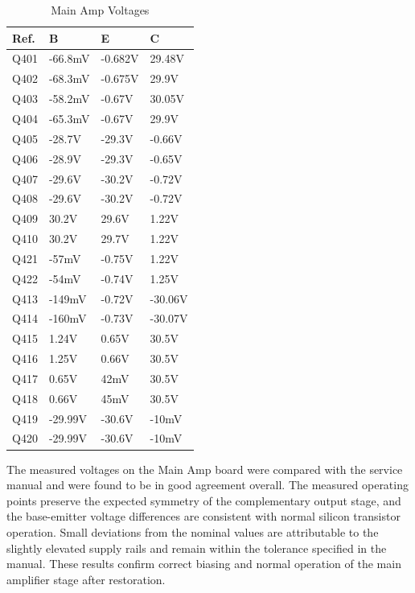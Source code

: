 \documentclass[]{article}
\begin{document}
\begin{table}[H]
	\centering
	\caption{Main Amp Voltages}
	\label{tab:main_amp_voltages}
	\begin{tabular}{|l|l|l|l|}
    \hline
 \textbf{Ref.} & \textbf{B} & \textbf{E} & \textbf{C} \\
    \hline
    Q401 & -66.8mV  & -0.682V  & 29.48V   \\
    \hline
    Q402 & -68.3mV  & -0.675V   & 29.9V  \\
    \hline
    Q403 & -58.2mV  &  -0.67V  & 30.05V  \\
    \hline
    Q404 & -65.3mV  &  -0.67V  & 29.9V \\
    \hline
    Q405 & -28.7V  & -29.3V  & -0.66V  \\
    \hline
    Q406 & -28.9V  & -29.3V   & -0.65V   \\
    \hline
    Q407 & -29.6V  &  -30.2V  &  -0.72V \\
    \hline
    Q408 & -29.6V  & -30.2V  &  -0.72V  \\
    \hline
    Q409 & 30.2V  &  29.6V  &  1.22V \\
    \hline
    Q410 & 30.2V  &  29.7V  &  1.22V \\
    \hline
    Q421 & -57mV  &  -0.75V  & 1.22V  \\
    \hline
    Q422 & -54mV  & -0.74V   & 1.25V  \\
    \hline
    Q413 & -149mV   &   -0.72V & -30.06V \\
    \hline
    Q414 & -160mV  &  -0.73V  & -30.07V  \\
    \hline
    Q415 & 1.24V  &  0.65V  & 30.5V  \\
    \hline
    Q416 & 1.25V   & 0.66V  & 30.5V   \\
    \hline
    Q417 &  0.65V  & 42mV  & 30.5V  \\
    \hline
    Q418 & 0.66V  & 45mV   & 30.5V \\
    \hline
    Q419 & -29.99V  & -30.6V  & -10mV\\
    \hline
    Q420 & -29.99V  & -30.6V & -10mV\\
    \hline
	\end{tabular}
\end{table}

The measured voltages on the Main Amp board were compared with the service manual and were found to be in good agreement overall. The measured operating points preserve the expected symmetry of the complementary output stage, and the base-emitter voltage differences are consistent with normal silicon transistor operation. Small deviations from the nominal values are attributable to the slightly elevated supply rails and remain within the tolerance specified in the manual. These results confirm correct biasing and normal operation of the main amplifier stage after restoration.
\end{document}
